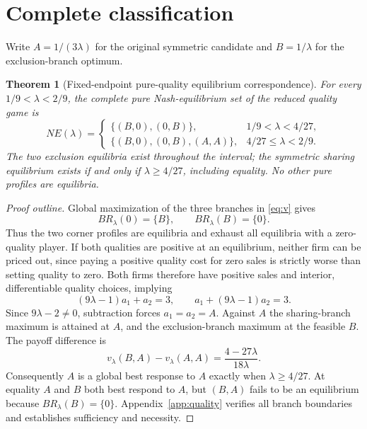 \documentclass[11pt]{article}
\newtheorem{theorem}{Theorem}
\begin{document}
\section{Complete classification}\label{sec:results}
Write $A=1/(3\lambda)$ for the original symmetric candidate and $B=1/\lambda$ for the exclusion-branch optimum.
\begin{theorem}[Fixed-endpoint pure-quality equilibrium correspondence]\label{thm:NE}
For every $1/9<\lambda<2/9$, the \emph{complete} pure Nash-equilibrium set of the reduced quality game is
\begin{equation}\label{eq:NE}
NE(\lambda)=\begin{cases}
\{(B,0),(0,B)\}, &1/9<\lambda<4/27,\\[3pt]
\{(B,0),(0,B),(A,A)\},&4/27\le\lambda<2/9.
\end{cases}
\end{equation}
The two exclusion equilibria exist throughout the interval; the symmetric sharing equilibrium exists \emph{if and only if} $\lambda\ge4/27$, including equality. No other pure profiles are equilibria.
\end{theorem}

\begin{proof}[Proof outline]
Global maximization of the three branches in \eqref{eq:v} gives
\begin{equation}\label{eq:corner}
BR_\lambda(0)=\{B\},\qquad BR_\lambda(B)=\{0\}.
\end{equation}
Thus the two corner profiles are equilibria and exhaust all equilibria with a zero-quality player. If both qualities are positive at an equilibrium, neither firm can be priced out, since paying a positive quality cost for zero sales is strictly worse than setting quality to zero. Both firms therefore have positive sales and interior, differentiable quality choices, implying
\begin{equation}\label{eq:FOC}
(9\lambda-1)a_1+a_2=3,\qquad a_1+(9\lambda-1)a_2=3.
\end{equation}
Since $9\lambda-2\ne0$, subtraction forces $a_1=a_2=A$. Against $A$ the sharing-branch maximum is attained at $A$, and the exclusion-branch maximum at the feasible $B$. The payoff difference is
\begin{equation}\label{eq:gain}
v_\lambda(B,A)-v_\lambda(A,A)=\frac{4-27\lambda}{18\lambda}.
\end{equation}
Consequently $A$ is a global best response to $A$ exactly when $\lambda\ge4/27$. At equality $A$ and $B$ both best respond to $A$, but $(B,A)$ fails to be an equilibrium because $BR_\lambda(B)=\{0\}$. Appendix~\ref{app:quality} verifies all branch boundaries and establishes sufficiency and necessity.
\end{proof}
\end{document}
